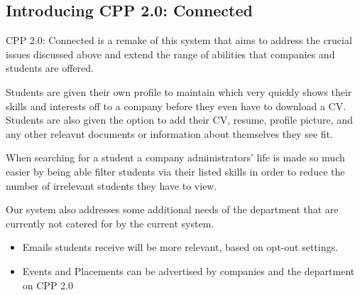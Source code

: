 \subsection{Introducing CPP 2.0: Connected}
CPP 2.0: Connected is a remake of this system that aims to address the crucial issues discussed above and extend the range of abilities that companies and students are offered.

Students are given their own profile to maintain which very quickly shows their skills and interests off to a company before they even have to download a CV. Students are also given the option to add their CV, resume, profile picture, and any other releavnt documents or information about themselves they see fit.

When searching for a student a company administrators' life is made so much easier by being able filter students via their listed skills in order to reduce the number of irrelevant students they have to view. 

Our system also addresses some additional needs of the department that are currently not catered for by the current system. 
\begin{itemize}
  \item Emails students receive will be more relevant, based on opt-out settings.
  \item Events and Placements can be advertised by companies and the department on CPP 2.0
\end{itemize}